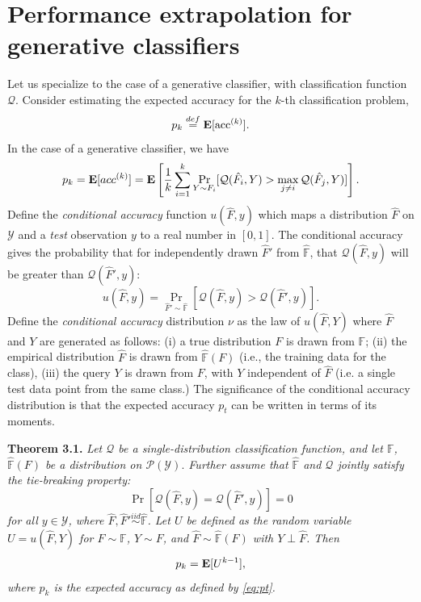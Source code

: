 \documentclass[12pt]{article}
\begin{document}
\section{Performance extrapolation for generative classifiers}

Let us specialize to the case of a generative classifier, with classification function $\mathcal{Q}$.
Consider estimating the expected accuracy for the $k$-th classification problem,
\begin{equation}\label{eq:pt}
p_k \stackrel{def}{=} \textbf{E}[\text{acc}^{(k)}].\end{equation}
In the case of a generative classifier, we have
\[
p_k = \textbf{E}[acc^{(k)}] = \textbf{E}\left[\frac{1}{k}\sum_{i=1}^k \Pr_{Y \sim F_i}[\mathcal{Q}(\hat{F}_i, Y) > \max_{j \neq i}\mathcal{Q}(\hat{F}_j, Y)]\right].
\]
Define the \emph{conditional accuracy} function $u(\hat{F}, y)$ which maps a
distribution $\hat{F}$ on $\mathcal{Y}$ and a \emph{test} observation $y$ to
a real number in $[0,1]$.  The conditional accuracy gives the
probability that for independently drawn $\hat{F}'$ from $\hat{\mathbb{F}}$, that
$\mathcal{Q}(\hat{F}, y)$ will be greater than $\mathcal{Q}(\hat{F}', y)$:
\[
u(\hat{F}, y) = \Pr_{\hat{F}' \sim \hat{\mathbb{F}}}[\mathcal{Q}(\hat{F}, y) > \mathcal{Q}(\hat{F}', y)].
\]
Define the \emph{conditional accuracy} distribution $\nu$ as the law
of $u(\hat{F}, Y)$ where $\hat{F}$ and $Y$ are generated as follows:
(i) a true distribution $F$ is drawn from $\mathbb{F}$; 
(ii) the empirical distribution $\hat{F}$ is drawn from $\hat{\mathbb{F}}(F)$ (i.e., the training data for the class),
(iii) the query $Y$ is drawn from $F$, with $Y$ independent of $\hat{F}$ (i.e. a single test data point from the same class.)
The significance of the conditional accuracy
distribution is that the expected accuracy $p_t$ can be
written in terms of its moments.

\noindent\textbf{Theorem 3.1.} \emph{
Let $\mathcal{Q}$ be a single-distribution classification function, and let $\mathbb{F}$, $\hat{\mathbb{F}}(F)$ be a distribution on $\mathcal{P}(\mathcal{Y}).$
Further assume that
$\hat{\mathbb{F}}$ and $\mathcal{Q}$ jointly satisfy the
\emph{tie-breaking} property:
\begin{equation}\label{eq:tie}
\Pr[\mathcal{Q}(\hat{F}, y) = \mathcal{Q}(\hat{F}', y)] = 0
\end{equation}
for all $y \in \mathcal{Y}$, where $\hat{F}, \hat{F}' \stackrel{iid}{\sim} \hat{\mathbb{F}}$.
Let $U$ be defined as the random variable
$U = u(\hat{F}, Y)$
for $F \sim \mathbb{F}$, $Y \sim F$, and $\hat{F} \sim \hat{\mathbb{F}}(F)$ with $Y \perp \hat{F}$.
Then \[p_k = \textbf{E}[U^{k-1}],\]
where $p_k$ is the expected accuracy as defined by \eqref{eq:pt}.
}
\end{document}
